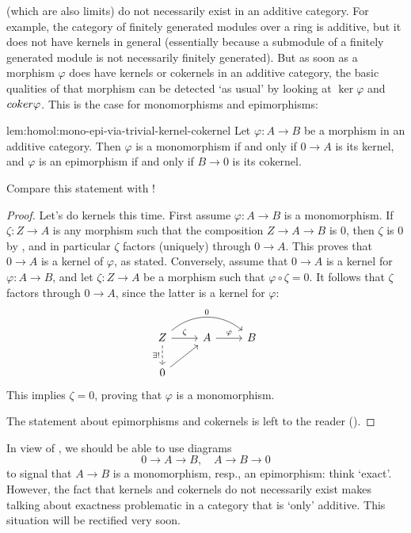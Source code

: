 (which are also limits) do not necessarily exist in an additive
category. For example, the category of finitely generated modules over
a ring is additive, but it does not have kernels in general
(essentially because a submodule of a finitely generated module is not
necessarily finitely generated). But as soon as a morphism $\varphi$
does have kernels or cokernels in an additive category, the basic
qualities of that morphism can be detected `as usual' by looking at
$\ker\varphi$ and $coker\varphi$. This is the case for monomorphisms
and epimorphisms:
\begin{lem}{}{lem:homol:mono-epi-via-trivial-kernel-cokernel}
  Let $\varphi : A \to B$ be a morphism in an additive category. Then
  $\varphi$ is a monomorphism if and only if $0 \to A$ is its kernel,
  and $\varphi$ is an epimorphism if and only if $B \to 0$ is its
  cokernel.
\end{lem}

Compare this statement with !

\begin{proof}
  Let's do kernels this time.  First assume $\varphi : A \to B$ is a
  monomorphism. If $\zeta : Z \to A$ is any morphism such that the
  composition $Z \to A \to B$ is $0$, then $\zeta$ is $0$ by
  , and in particular $\zeta$ factors (uniquely)
  through $0 \to A$. This proves that $0 \to A$ is a kernel of
  $\varphi$, as stated.  Conversely, assume that $0 \to A$ is a kernel
  for $\varphi : A \to B$, and let $\zeta : Z \to A$ be a morphism
  such that $\varphi \circ \zeta = 0$. It follows that $\zeta$ factors
  through $0 \to A$, since the latter is a kernel for $\varphi$:
  \[\begin{tikzcd}
      Z \arrow[rr, "0", bend left=40] \arrow[r, "\zeta"] \arrow[d,
      dashed, "\exists!"'] &
      A \arrow[r, "\varphi"] & B \\
      0 \arrow[ur]
    \end{tikzcd}\] This implies $\zeta = 0$, proving that $\varphi$ is
  a monomorphism.

  The statement about epimorphisms and cokernels is left to the reader
  ().
\end{proof}
In view of , we should be able to use diagrams
\[
  0 \to A \to B, \quad A \to B \to 0
\]
to signal that $A \to B$ is a monomorphism, resp., an epimorphism:
think `exact'. However, the fact that kernels and cokernels do not
necessarily exist makes talking about exactness problematic in a
category that is `only' additive. This situation will be rectified
very soon.

